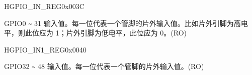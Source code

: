 \begin{register}{H}{GPIO\_IN\_REG}{0x{}003C}\label{regdesc:GPIOINREG}
%
\regnewline%
\begin{regdesc}\begin{reglist}
\label{fielddesc:GPIOINDATANEXT}\item [GPIO\_IN\_DATA\_NEXT] GPIO0 \verb+~+ 31 输入值。每一位代表一个管脚的片外输入值。比如片外引脚为高电平，则此位应为 1；片外引脚为低电平，此位应为 0。(RO)
\end{reglist}\end{regdesc}
\end{register}


\begin{register}{H}{GPIO\_IN1\_REG}{0x{}0040}\label{regdesc:GPIOIN1REG}
%
%
\regnewline%
\begin{regdesc}\begin{reglist}
\label{fielddesc:GPIOINDATA1NEXT}\item [GPIO\_IN\_DATA1\_NEXT] GPIO32 \verb+~+ 48 输入值。每一位代表一个管脚的片外输入值。(RO)
\end{reglist}\end{regdesc}
\end{register}


